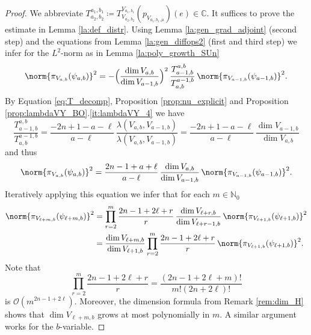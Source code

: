 \documentclass[JEP,XML,SOM,NoFloatCountersInSection,Unicode,published]{cedram}
\theoremstyle{definition}
\DeclarePairedDelimiter{\norm}\lVert\rVert
\newcommand{\mc}[1]{\ensuremath{\mathcal{#1}}}
\newcommand{\N}{\ensuremath{\mathbb{N}}}
\newcommand{\C}{\ensuremath{\mathbb{C}}}
\begin{document}
\begin{proof}
We abbreviate $T^{a_1,b_1}_{a_2,b_2}\coloneqq T_{V_{a_2,b_2}}^{V_{a_1,b_1}}(p_{V_{a_1,b_1,\mu}})(e)\in\C$. It suffices to prove the estimate in Lemma \ref{la:def_distr}. Using Lemma \ref{la:gen_grad_adjoint} (second step) and the equations from Lemma \ref{la:gen_diffops2} (first and third step) we infer for the $L^2$-norm as in Lemma \ref{la:poly_growth_SUn}
\[
\norm{\pi_{V_{a,b}}(\psi_{a,b})}^2=
-\Bigl(\frac{\dim V_{a,b}}{\dim V_{a-1,b}}\Bigr)^2\,\frac{T^{a,b}_{a-1,b}}{T^{a-1,b}_{a,b}}\,\norm{\pi_{V_{a-1,b}}(\psi_{a-1,b})}^2.
\]
By Equation \eqref{eq:T_decomp}, Proposition \ref{prop:nu_explicit} and Proposition \ref{prop:lambdaVY_BO}.\ref{it:lambdaVY_4} we have
\[
\frac{T^{a,b}_{a-1,b}}{T^{a-1,b}_{a,b}}=\frac{-2n+1-a-\ell}{a-\ell}\,\frac{\lambda(V_{a,b},V_{a-1,b})}{\lambda(V_{a,b},V_{a-1,b})}=\frac{-2n+1-a-\ell}{a-\ell}\,\frac{\dim V_{a-1,b}}{\dim V_{a,b}}
\]
and thus
\[
\norm{\pi_{V_{a,b}}(\psi_{a,b})}^2=\frac{2n-1+a+\ell}{a-\ell}\,\frac{\dim V_{a,b}}{\dim V_{a-1,b}}\,\norm{\pi_{V_{a-1,b}}(\psi_{a-1,b})}^2.
\]
Iteratively applying this equation we infer that for each $m\in\N_0$
\begin{align*}
\norm{\pi_{V_{\ell+m,b}}(\psi_{\ell+m,b})}^2&=\prod_{r=2}^m\frac{2n-1+2\ell+r}{r}\,\frac{\dim V_{\ell+r,b}}{\dim V_{\ell+r-1,b}}\,\norm{\pi_{V_{\ell+1,b}}(\psi_{\ell+1,b})}^2\\
&=\frac{\dim V_{\ell+m,b}}{\dim V_{\ell+1,b}}\prod_{r=2}^m\frac{2n-1+2\ell+r}{r}\,\norm{\pi_{V_{\ell+1,b}}(\psi_{\ell+1,b})}^2.
\end{align*}
Note that
\[
\prod_{r=2}^m\frac{2n-1+2\ell+r}{r}=\frac{(2n-1+2\ell+m)!}{m!(2n+2\ell)!}
\]
is $\mc O(m^{2n-1+2\ell})$. Moreover, the dimension formula from Remark \ref{rem:dim_H} shows that $\dim V_{\ell+m,b}$ grows at most polynomially in $m$. A similar argument works for the $b$\nobreakdash-vari\-able.
\end{proof}
\end{document}
